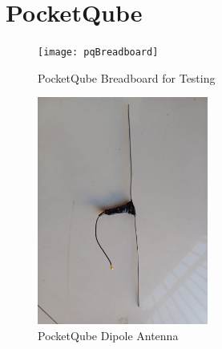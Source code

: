 \section{PocketQube}\label{sec:appendix_pq}
\begin{figure}[!htb]
    \centering
    \texttt{[image: pqBreadboard]}
    \caption{PocketQube Breadboard for Testing}
    \label{fig:pqBreadboard}
\end{figure}
\begin{figure}[!htb]
  \centering
  \includegraphics[width=0.5\textwidth,angle=90]{pqAntenna}
  \caption{PocketQube Dipole Antenna}
  \label{fig:pqAntenna}
\end{figure}
\newpage
